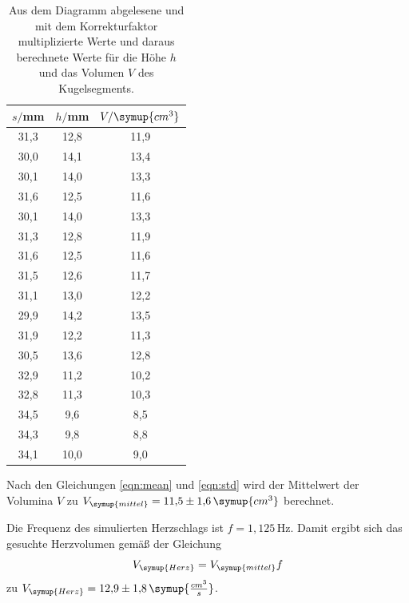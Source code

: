 \begin{table}[htp]
	\begin{center}
    \label{tab:herz}
    \caption{Aus dem Diagramm abgelesene und mit dem Korrekturfaktor multiplizierte Werte und
    daraus berechnete Werte für die Höhe $h$ und das Volumen $V$ des Kugelsegments.}
		\begin{tabular}{ccc}
		\toprule
			{$s/$mm} & {$h/$mm} & {$V/\symup{cm^3}$}\\
			\midrule
			31,3 & 12,8 & 11,9\\
			30,0 & 14,1 & 13,4\\
			30,1 & 14,0 & 13,3\\
			31,6 & 12,5 & 11,6\\
			30,1 & 14,0 & 13,3\\
			31,3 & 12,8 & 11,9\\
			31,6 & 12,5 & 11,6\\
			31,5 & 12,6 & 11,7\\
			31,1 & 13,0 & 12,2\\
			29,9 & 14,2 & 13,5\\
			31,9 & 12,2 & 11,3\\
			30,5 & 13,6 & 12,8\\
			32,9 & 11,2 & 10,2\\
			32,8 & 11,3 & 10,3\\
			34,5 & 9,6 & 8,5\\
			34,3 & 9,8 & 8,8\\
			34,1 & 10,0 & 9,0\\
		\bottomrule
		\end{tabular}
	\end{center}
\end{table}

Nach den Gleichungen \eqref{eqn:mean} und \eqref{eqn:std} wird der Mittelwert
der Volumina $V$ zu $V_{\symup{mittel}}=11{,}5\pm1{,}6\,\symup{cm^3}$ berechnet.

Die Frequenz des simulierten Herzschlags ist $f=1{,}125\,$Hz. Damit ergibt sich
das gesuchte Herzvolumen gemäß der Gleichung
\begin{equation}
  V_{\symup{Herz}} = V_{\symup{mittel}} f
\end{equation}
zu $V_{\symup{Herz}}=12{,}9\pm1{,}8\, \symup{\frac{cm^3}{s}}$.
